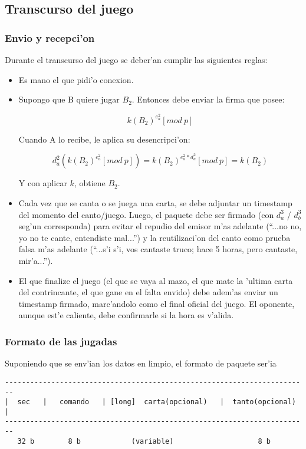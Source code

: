 \subsection{Transcurso del juego}
\subsubsection{Envio y recepci'on}
Durante el transcurso del juego se deber'an cumplir las siguientes reglas:

\begin{itemize}
\item Es mano el que pidi'o conexion.

\item Supongo que B quiere jugar $B_2$. Entonces debe enviar la firma que posee:

$$	k(B_2)^{e^2_a} [mod\ p] $$
	
Cuando A lo recibe, le aplica su desencripci'on:

$$	d^2_a(k(B_2)^{e^2_a} [mod\ p]) = 
	k(B_2)^{e^2_a * d^2_a} [mod\ p] = 
	k(B_2) $$

Y con aplicar $k$, obtiene $B_2$.

\item Cada vez que se canta o se juega una carta, se debe adjuntar un timestamp del momento del canto/juego. Luego, el paquete debe ser firmado (con $d^3_a$ / $d^3_b$ seg'un corresponda) para evitar el repudio del emisor m'as adelante (``...no no, yo no te cante, entendiste mal...'') y la reutilizaci'on del canto como prueba falsa m'as adelante (``...s'i s'i, vos cantaste truco; hace 5 horas, pero cantaste, mir'a...'').

\item El que finalize el juego (el que se vaya al mazo, el que mate la 'ultima carta del contrincante, el que gane en el falta envido) debe adem'as enviar un timestamp firmado, marc'andolo como el final oficial del juego. El oponente, aunque est'e caliente, debe confirmarle si la hora es v'alida.

\end{itemize}


\subsubsection{Formato de las jugadas}
Suponiendo que se env'ian los datos en limpio, el formato de paquete ser'ia

\begin{verbatim}
------------------------------------------------------------------------
|  sec   |   comando   | [long]  carta(opcional)   |  tanto(opcional)  |
------------------------------------------------------------------------
   32 b        8 b            (variable)                    8 b
\end{verbatim}


